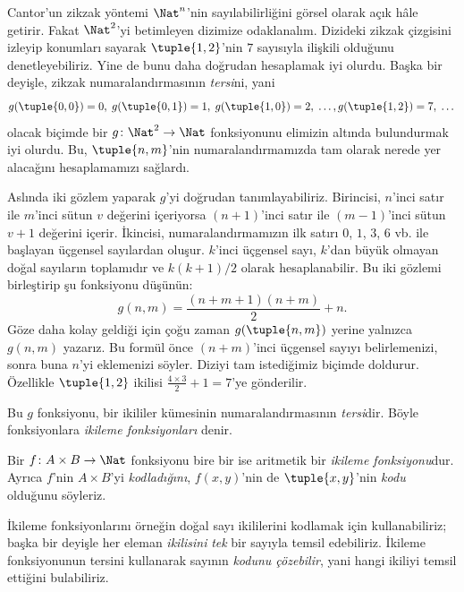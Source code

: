 


\begin{explain}
Cantor'un zikzak yöntemi $\Nat^n$'nin sayılabilirliğini görsel olarak açık
hâle getirir. Fakat $\Nat^2$'yi betimleyen dizimize odaklanalım. Dizideki
zikzak çizgisini izleyip konumları sayarak $\tuple{1,2}$'nin $7$ sayısıyla
ilişkili olduğunu denetleyebiliriz. Yine de bunu daha doğrudan hesaplamak iyi
olurdu. Başka bir deyişle, zikzak numaralandırmasının
\emph{tersi}ni, yani
\[
g(\tuple{0,0}) = 0, \;
g(\tuple{0,1}) = 1, \;
g(\tuple{1,0}) = 2, \; \dots,
g(\tuple{1,2}) = 7, \; \dots
\]
olacak biçimde bir $g\colon \Nat^2 \to \Nat$ fonksiyonunu elimizin altında
bulundurmak iyi olurdu. Bu, $\tuple{n,m}$'nin numaralandırmamızda tam olarak
nerede yer alacağını hesaplamamızı sağlardı.

Aslında iki gözlem yaparak $g$'yi doğrudan tanımlayabiliriz. Birincisi,
$n$'inci satır ile $m$'inci sütun $v$ değerini içeriyorsa $(n+1)$'inci satır
ile $(m-1)$'inci sütun $v+1$ değerini içerir. İkincisi,
numaralandırmamızın ilk satırı $0$, $1$, $3$, $6$ vb. ile başlayan üçgensel
sayılardan oluşur. $k$'inci üçgensel sayı, $k$'dan büyük olmayan doğal
sayıların toplamıdır ve $k(k+1)/2$ olarak hesaplanabilir. Bu iki gözlemi birleştirip şu
fonksiyonu düşünün:
\[
  g(n,m) = \frac{(n+m+1)(n+m)}{2} + n.
\]
Göze daha kolay geldiği için çoğu zaman $g(\tuple{n,m})$ yerine yalnızca
$g(n,m)$ yazarız. Bu formül önce $(n+m)$'inci üçgensel sayıyı belirlemenizi,
sonra buna $n$'yi eklemenizi söyler. Diziyi tam istediğimiz biçimde doldurur.
Özellikle $\tuple{1,2}$ ikilisi $\frac{4 \times 3}{2}+1=7$'ye gönderilir.

Bu $g$ fonksiyonu, bir ikililer kümesinin numaralandırmasının
\emph{tersi}dir. Böyle fonksiyonlara \emph{ikileme fonksiyonları} denir.
\end{explain}

\begin{defn}
  Bir $f\colon A \times B \to \Nat$ fonksiyonu bire bir ise aritmetik bir
  \emph{ikileme fonksiyonu}dur. Ayrıca $f$'nin $A \times B$'yi
  \emph{kodladığını}, $f(x,y)$'nin de $\tuple{x,y}$'nin \emph{kodu}
  olduğunu söyleriz.
\end{defn}

\begin{explain}
İkileme fonksiyonlarını örneğin doğal sayı ikililerini kodlamak için
kullanabiliriz; başka bir deyişle her eleman \emph{ikilisini} \emph{tek} bir
sayıyla temsil edebiliriz. İkileme fonksiyonunun tersini kullanarak sayının
\emph{kodunu çözebilir}, yani hangi ikiliyi temsil ettiğini bulabiliriz.
\end{explain}

